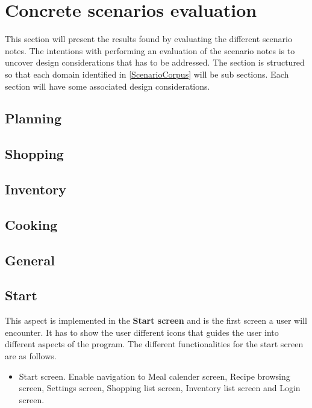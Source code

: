\section{Concrete scenarios evaluation}  
This section will present the results found by evaluating the different scenario notes. The intentions with performing an evaluation of the scenario notes is to uncover design considerations that has to be addressed. The section is structured so that each domain identified in \cref{ScenarioCorpus} will be sub sections. Each section will have some associated design considerations. 

\subsection{Planning}

\subsection{Shopping}

\subsection{Inventory}

\subsection{Cooking}

\subsection{General}






\subsection{Start}
This aspect is implemented in the \textbf{Start screen} and is the first screen a user will encounter. It has to show the user different icons that guides the user into different aspects of the program. The different functionalities for the start screen are as follows.

\begin{itemize}
	\item Start screen.	
		\subitem Enable navigation to Meal calender screen, Recipe browsing screen, Settings screen, 				Shopping list screen, Inventory list screen and Login screen.
\end{itemize}

